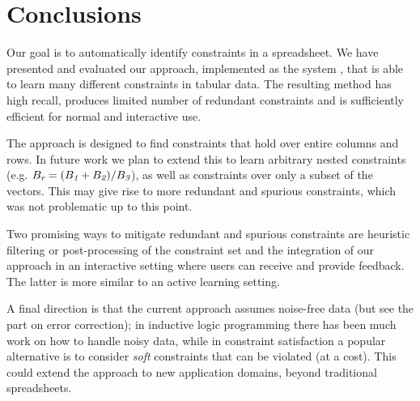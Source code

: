 \section{Conclusions}\label{sec:conclusions}

Our goal is to automatically identify constraints in a spreadsheet.
We have presented and evaluated our approach, implemented as the system \sname, that is able to learn many different constraints in tabular data.
The resulting method has high recall, produces limited number of redundant constraints and is sufficiently efficient for normal and interactive use.

The approach is designed to find constraints that hold over entire columns and rows. In future work we plan to extend this to learn arbitrary nested constraints (e.g. $B_{\textit{r}} = (B_{\textit{1}} + B_{\textit{2}}) / B_{\textit{3}}$), as well as constraints over only a subset of the vectors. This may give rise to more redundant and spurious constraints, which was not problematic up to this point.

Two promising ways to mitigate redundant and spurious constraints are heuristic filtering or post-processing of the constraint set and the integration of our approach in an interactive setting where users can receive and provide feedback.
The latter is more similar to an active learning setting.

A final direction is that the current approach assumes noise-free data (but see the part on error correction); in inductive logic programming there has been much work on how to handle noisy data, while in constraint satisfaction a popular alternative is to consider \textit{soft} constraints that can be violated (at a cost). 
This could extend the approach to new application domains, beyond traditional spreadsheets.



{
  }

